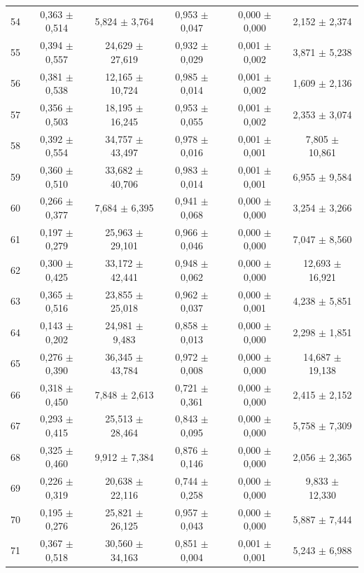 \begin{tabular}{l c c c c c}
54 & 0,363 $\pm$ 0,514 & 5,824 $\pm$ 3,764 & 0,953 $\pm$ 0,047 & 0,000 $\pm$ 0,000 & 2,152 $\pm$ 2,374 \\
55 & 0,394 $\pm$ 0,557 & 24,629 $\pm$ 27,619 & 0,932 $\pm$ 0,029 & 0,001 $\pm$ 0,002 & 3,871 $\pm$ 5,238 \\
56 & 0,381 $\pm$ 0,538 & 12,165 $\pm$ 10,724 & 0,985 $\pm$ 0,014 & 0,001 $\pm$ 0,002 & 1,609 $\pm$ 2,136 \\
57 & 0,356 $\pm$ 0,503 & 18,195 $\pm$ 16,245 & 0,953 $\pm$ 0,055 & 0,001 $\pm$ 0,002 & 2,353 $\pm$ 3,074 \\
58 & 0,392 $\pm$ 0,554 & 34,757 $\pm$ 43,497 & 0,978 $\pm$ 0,016 & 0,001 $\pm$ 0,001 & 7,805 $\pm$ 10,861 \\
59 & 0,360 $\pm$ 0,510 & 33,682 $\pm$ 40,706 & 0,983 $\pm$ 0,014 & 0,001 $\pm$ 0,001 & 6,955 $\pm$ 9,584 \\
60 & 0,266 $\pm$ 0,377 & 7,684 $\pm$ 6,395 & 0,941 $\pm$ 0,068 & 0,000 $\pm$ 0,000 & 3,254 $\pm$ 3,266 \\
61 & 0,197 $\pm$ 0,279 & 25,963 $\pm$ 29,101 & 0,966 $\pm$ 0,046 & 0,000 $\pm$ 0,000 & 7,047 $\pm$ 8,560 \\
62 & 0,300 $\pm$ 0,425 & 33,172 $\pm$ 42,441 & 0,948 $\pm$ 0,062 & 0,000 $\pm$ 0,000 & 12,693 $\pm$ 16,921 \\
63 & 0,365 $\pm$ 0,516 & 23,855 $\pm$ 25,018 & 0,962 $\pm$ 0,037 & 0,000 $\pm$ 0,001 & 4,238 $\pm$ 5,851 \\
64 & 0,143 $\pm$ 0,202 & 24,981 $\pm$ 9,483 & 0,858 $\pm$ 0,013 & 0,000 $\pm$ 0,000 & 2,298 $\pm$ 1,851 \\
65 & 0,276 $\pm$ 0,390 & 36,345 $\pm$ 43,784 & 0,972 $\pm$ 0,008 & 0,000 $\pm$ 0,000 & 14,687 $\pm$ 19,138 \\
66 & 0,318 $\pm$ 0,450 & 7,848 $\pm$ 2,613 & 0,721 $\pm$ 0,361 & 0,000 $\pm$ 0,000 & 2,415 $\pm$ 2,152 \\
67 & 0,293 $\pm$ 0,415 & 25,513 $\pm$ 28,464 & 0,843 $\pm$ 0,095 & 0,000 $\pm$ 0,000 & 5,758 $\pm$ 7,309 \\
68 & 0,325 $\pm$ 0,460 & 9,912 $\pm$ 7,384 & 0,876 $\pm$ 0,146 & 0,000 $\pm$ 0,000 & 2,056 $\pm$ 2,365 \\
69 & 0,226 $\pm$ 0,319 & 20,638 $\pm$ 22,116 & 0,744 $\pm$ 0,258 & 0,000 $\pm$ 0,000 & 9,833 $\pm$ 12,330 \\
70 & 0,195 $\pm$ 0,276 & 25,821 $\pm$ 26,125 & 0,957 $\pm$ 0,043 & 0,000 $\pm$ 0,000 & 5,887 $\pm$ 7,444 \\
71 & 0,367 $\pm$ 0,518 & 30,560 $\pm$ 34,163 & 0,851 $\pm$ 0,004 & 0,001 $\pm$ 0,001 & 5,243 $\pm$ 6,988 \\

\end{tabular}
